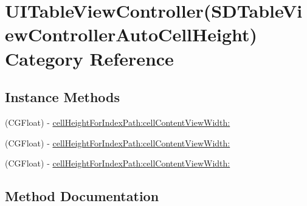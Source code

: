 \hypertarget{category_u_i_table_view_controller_07_s_d_table_view_controller_auto_cell_height_08}{}\section{U\+I\+Table\+View\+Controller(S\+D\+Table\+View\+Controller\+Auto\+Cell\+Height) Category Reference}
\label{category_u_i_table_view_controller_07_s_d_table_view_controller_auto_cell_height_08}
\subsection*{Instance Methods}
\begin{DoxyCompactItemize}
\item 
(C\+G\+Float) -\/ \mbox{\hyperlink{category_u_i_table_view_controller_07_s_d_table_view_controller_auto_cell_height_08_a0b27faff66706fa974400d4904f264c8}{cell\+Height\+For\+Index\+Path\+:cell\+Content\+View\+Width\+:}}
\item 
(C\+G\+Float) -\/ \mbox{\hyperlink{category_u_i_table_view_controller_07_s_d_table_view_controller_auto_cell_height_08_a0b27faff66706fa974400d4904f264c8}{cell\+Height\+For\+Index\+Path\+:cell\+Content\+View\+Width\+:}}
\item 
(C\+G\+Float) -\/ \mbox{\hyperlink{category_u_i_table_view_controller_07_s_d_table_view_controller_auto_cell_height_08_a0b27faff66706fa974400d4904f264c8}{cell\+Height\+For\+Index\+Path\+:cell\+Content\+View\+Width\+:}}
\end{DoxyCompactItemize}


\subsection{Method Documentation}
\mbox{\label{category_u_i_table_view_controller_07_s_d_table_view_controller_auto_cell_height_08_a0b27faff66706fa974400d4904f264c8}} 
